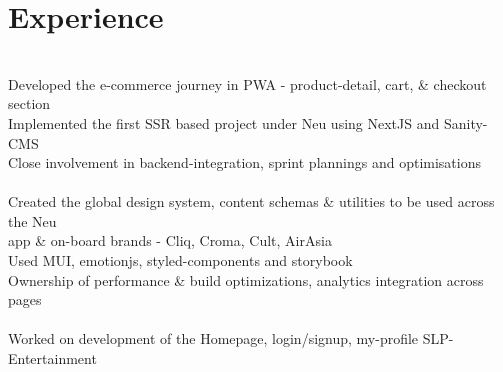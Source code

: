 \documentclass[]{deedy-resume-openfont}
\begin{document}
\begin{minipage}[t]{0.66\textwidth} 


\section{Experience}
\vspace{1mm}
\vspace{1.5mm}

\small {
\\
\hspace{2mm}    \textbullet{} Developed the e-commerce journey in PWA - product-detail, cart, \& checkout section\\ 
\hspace{2mm}    \textbullet{} Implemented the first SSR based project under Neu using NextJS and Sanity-CMS\\
\hspace{2mm}    \textbullet{} Close involvement in backend-integration, sprint plannings and optimisations\\
\vspace{1.5mm}
\\
\hspace{2mm} \textbullet{} Created the global design system, content schemas \& utilities to be used across the Neu\\
\hspace{5mm} app \& on-board brands - Cliq, Croma, Cult, AirAsia\\
\hspace{2mm} \textbullet{} Used MUI, emotionjs, styled-components and storybook\\
\hspace{2mm} \textbullet{} Ownership of performance \& build optimizations, analytics integration across pages\\
\vspace{1.5mm}
\\
\hspace{2mm} \textbullet{} Worked on development of the Homepage, login/signup, my-profile SLP- Entertainment\\
}
\end{minipage}
\end{document}
